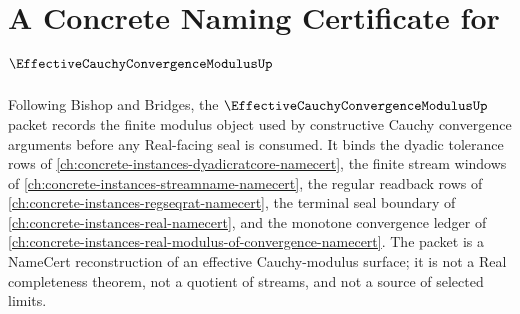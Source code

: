 \chapter{A Concrete Naming Certificate for $\EffectiveCauchyConvergenceModulusUp$}
\label{ch:concrete-instances-effective-cauchy-convergence-modulus-namecert}

Following Bishop and Bridges, the $\EffectiveCauchyConvergenceModulusUp$ packet records the finite modulus object used by constructive Cauchy convergence arguments before any Real-facing seal is consumed. It binds the dyadic tolerance rows of \autoref{ch:concrete-instances-dyadicratcore-namecert}, the finite stream windows of \autoref{ch:concrete-instances-streamname-namecert}, the regular readback rows of \autoref{ch:concrete-instances-regseqrat-namecert}, the terminal seal boundary of \autoref{ch:concrete-instances-real-namecert}, and the monotone convergence ledger of \autoref{ch:concrete-instances-real-modulus-of-convergence-namecert}. The packet is a NameCert reconstruction of an effective Cauchy-modulus surface; it is not a Real completeness theorem, not a quotient of streams, and not a source of selected limits.

